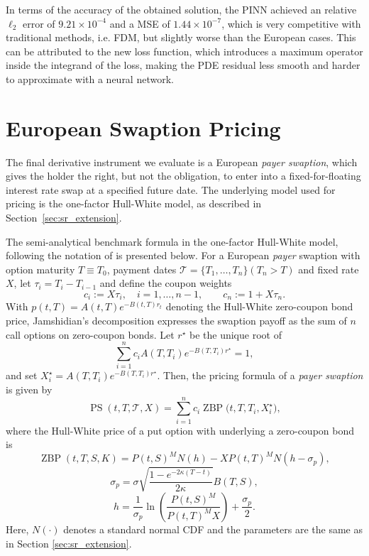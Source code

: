 \documentclass[12pt]{report} %
\theoremstyle{plain} %
\theoremstyle{definition} %
\theoremstyle{remark} %
\begin{document}
In terms of the accuracy of the obtained solution, the PINN achieved an relative \(\ell_2\) error of 
\(9.21\times10^{-4}\) and a MSE of \(1.44\times10^{-7}\), which is very competitive with traditional methods, i.e. FDM, but slightly worse than the European cases. This can be 
attributed to the new loss function, which introduces a maximum operator inside the integrand of the loss, making the PDE residual less 
smooth and harder to approximate with a neural network.

\section{European Swaption Pricing}

The final derivative instrument we evaluate is a European \emph{payer swaption}, which 
gives the holder the right, but not the obligation, to enter into a fixed-for-floating 
interest rate swap at a specified future date. The underlying model used for pricing is 
the one-factor Hull-White model, as described in Section~\ref{sec:sr_extension}. 

The semi-analytical benchmark formula in the one-factor Hull-White model, following 
the notation of \cite{brigo2013interest} is presented below.  
For a European \emph{payer} swaption with option maturity \(T\equiv T_{0}\), 
payment dates \(\mathcal{T}=\{T_{1},\ldots ,T_{n}\} (T_{n}>T)\) and fixed 
rate \(X\), let \(\tau_i=T_i-T_{i-1}\) and define the coupon weights
\[
c_i := X\tau_i,\quad i=1,\ldots ,n-1,\qquad c_n := 1+X\tau_n .
\]
With \(p(t,T)=A(t,T)e^{-B(t,T)r_t}\) denoting the Hull-White zero-coupon bond price, 
Jamshidian's decomposition \cite{jamshidian1989exact} expresses the swaption payoff as the sum of \(n\) call options on zero-coupon bonds.  Let \(r^{\star}\) be the unique root of
\[
\sum_{i=1}^{n} c_i A(T,T_i) e^{-B(T,T_i)r^{\star}} = 1,
\]
and set \(X_i^{\star}=A(T,T_i)e^{-B(T,T_i)r^{\star}}\). Then, the pricing formula of a \emph{payer swaption} is given by
\[
\operatorname{PS}(t,T,\mathcal{T},X)
        = \sum_{i=1}^{n} c_i 
          \operatorname{ZBP} \bigl(t,T,T_i,X_i^{\star}\bigr),
\]
where the Hull-White price of a put option with underlying a zero-coupon bond is
\[
\operatorname{ZBP}(t,T,S,K)=P(t,S)^M N(h)-X P(t,T)^M N(h-\sigma_p),
\]
\[
\sigma_p = \sigma\sqrt{\frac{1-e^{-2\kappa(T-t)}}{2\kappa}}B(T,S),
\]
\[
h = \frac{1}{\sigma_p}\operatorname{ln}\left(\frac{P(t,S)^M}{P(t,T)^M X}\right)+\frac{\sigma_p}{2}.
\]
Here, $N(\cdot)$ denotes a standard normal CDF and the parameters are the same as in Section \ref{sec:sr_extension}.
\end{document}
